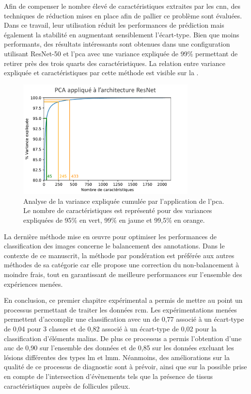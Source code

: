 Afin de compenser le nombre élevé de caractéristiques extraites par les \gls{cnn}, des techniques de réduction mises en place afin de pallier ce problème sont évaluées. Dans ce travail, leur utilisation réduit les performances de prédiction mais également la stabilité en augmentant sensiblement l'écart-type. Bien que moins performants, des résultats intéressants sont obtenues dans une configuration utilisant ResNet-50 et l'\gls{pca} avec une variance expliquée de 99\% permettant de retirer près des trois quarts des caractéristiques. La relation entre variance expliquée et caractéristiques par cette méthode est visible sur la .\par

\begin{figure}[H]
    \centering
    \includegraphics[width=0.8\textwidth]{contents/chapter_4/resources/results_image_classification_pca_variance.pdf}
    \caption{Analyse de la variance expliquée cumulée par l'application de l'\gls{pca}. Le nombre de caractéristiques est représenté pour des variances expliquées de 95\% en vert, 99\% en jaune et 99,5\% en orange.}
    \label{fig:results_image_classification_pca_variance}
\end{figure}\par

La dernière méthode mise en œuvre pour optimiser les performances de classification des images concerne le balancement des annotations. Dans le contexte de ce manuscrit, la méthode par pondération est préférée aux autres méthodes de sa catégorie car elle propose une correction du non-balancement à moindre frais, tout en garantissant de meilleure performances sur l'ensemble des expériences menées.\par

En conclusion, ce premier chapitre expérimental a permis de mettre au point un processus permettant de traiter les données \gls{rcm}. Les expérimentations menées permettent d'accomplir une classification avec un \fscore{} de 0,77 associé à un écart-type de 0,04 pour 3 classes et de 0,82 associé à un écart-type de 0,02 pour la classification d'éléments malins. De plus ce processus a permis l'obtention d'une \gls{auc} de 0,90 sur l'ensemble des données et de 0,85 sur les données excluant les lésions différentes des types \gls{lm} et \gls{lmm}. Néanmoins, des améliorations sur la qualité de ce processus de diagnostic sont à prévoir, ainsi que sur la possible prise en compte de l'intersection d'évènements tels que la présence de tissus caractéristiques auprès de follicules pileux.\par
